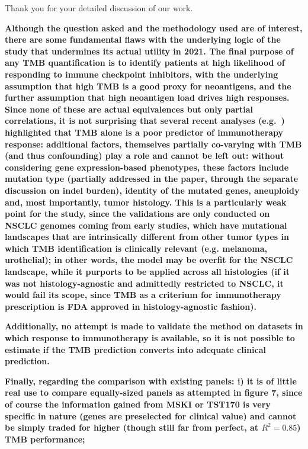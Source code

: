 \documentclass[12pt]{article}
\begin{document}
Thank you for your detailed discussion of our work.  

\textbf{Although the question asked and the methodology used are of interest, there are some fundamental flaws with the underlying logic of the study that undermines its actual utility in 2021. The final purpose of any TMB quantification is to identify patients at high likelihood of responding to immune checkpoint inhibitors, with the underlying assumption that high TMB is a good proxy for neoantigens, and the further assumption that high neoantigen load drives high responses. Since none of these are actual equivalences but only partial correlations, it is not surprising that several recent analyses (e.g.~\citet{litchfield2021meta}) highlighted that TMB alone is a poor predictor of immunotherapy response: additional factors, themselves partially co-varying with TMB (and thus confounding) play a role and cannot be left out: without considering gene expression-based phenotypes, these factors include mutation type (partially addressed in the paper, through the separate discussion on indel
burden), identity of the mutated genes, aneuploidy and, most importantly, tumor histology. This is a particularly weak point for the study, since the validations are only conducted on NSCLC genomes coming from early studies, which have mutational landscapes that are intrinsically different from other tumor types in which TMB identification is clinically relevant (e.g. melanoma, urothelial); in other words, the model may be overfit for the NSCLC landscape, while it purports to be applied across all histologies (if it was not histology-agnostic and admittedly restricted to NSCLC, it would fail its scope, since TMB as a criterium for immunotherapy prescription is FDA approved in histology-agnostic fashion).}



\textbf{Additionally, no attempt is made to validate the method on datasets in which response to immunotherapy is available, so it is not possible to estimate if the TMB prediction converts into adequate clinical prediction.}


\textbf{Finally, regarding the comparison with existing panels: 
i) it is of little real use to compare equally-sized panels as attempted in figure 7, since of course the information gained from MSKI or TST170 is very specific in nature (genes are preselected for clinical value) and cannot be simply traded for higher (though still far from perfect, at $R^2=0.85$) TMB performance;}
\end{document}

